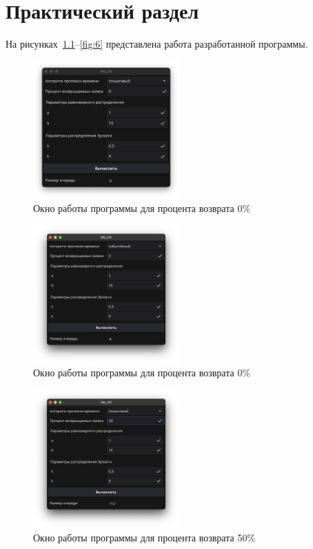 \chapter{Практический раздел}

На рисунках~\ref{fig:1}--\ref{fig:6} представлена работа разработанной программы.

\begin{figure}[ht]
    \centering
    \includegraphics[width=0.5\textwidth]{assets/1.png}
    \caption{Окно работы программы для процента возврата 0\%}
    \label{fig:1}
\end{figure}

\begin{figure}[ht]
    \centering
    \includegraphics[width=0.5\textwidth]{assets/2.png}
    \caption{Окно работы программы для процента возврата 0\%}
    \label{fig:2}
\end{figure}

\newpage

\begin{figure}[ht]
    \centering
    \includegraphics[width=0.5\textwidth]{assets/3.png}
    \caption{Окно работы программы для процента возврата 50\%}
    \label{fig:3}
\end{figure}

